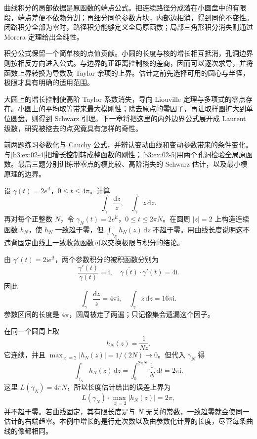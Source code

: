 \begin{chaptersummary}
曲线积分的局部依据是原函数的端点公式。把连续路径分成落在小圆盘中的有限段，端点差便不依赖分割；再细分同伦参数方块，内部边相消，得到同伦不变性。闭路积分全部为零时，路径积分能够定义全局原函数；局部三角形积分消失则通过 Morera 定理给出全纯性。

\ProseParagraphBreak

积分公式保留一个简单核的点值贡献。小圆的长度与核的增长相互抵消，孔洞边界则按相反方向进入公式。与边界的正距离控制核的差商，因而可以逐次求导，并将函数上界转换为导数及 Taylor 余项的上界。估计之前先选择可用的圆心与半径，极限才具有明确的适用范围。

\ProseParagraphBreak

大圆上的增长控制使高阶 Taylor 系数消失，导向 Liouville 定理与多项式的零点存在。小圆上的平均取等带来最大模刚性；除去原点的零因子，再让取样圆扩大到单位圆盘，则得到 Schwarz 引理。下一章将把这里的内外边界公式展开成 Laurent 级数，研究被挖去的点究竟具有怎样的奇性。
\end{chaptersummary}

\BookExercises

前两题练习参数化与 Cauchy 公式，并辨认变动曲线和变动参数带来的条件变化。与\cref{b3:ex:02-4}把增长控制转成整函数的刚性；\cref{b3:ex:02-5}用两个孔洞检验全局原函数。最后三题分别训练带零点的模比较、高阶消失的 Schwarz 估计，以及最小模原理的边界。


\begin{exercise}\label{b3:ex:02-1}
设 \(\gamma(t)=2e^{\mathrm{i}t}\)，\(0\le t\le4\pi\)。计算
\[
  \int_\gamma\frac{\mathrm{d}z}{z},
  \quad\int_\gamma\overline z\,\mathrm{d}z.
\]
再对每个正整数 \(N\)，令 \(\gamma_N(t)=2e^{\mathrm{i}t}\)，\(0\le t\le2\pi N\)。在圆周 \(|z|=2\) 上构造连续函数 \(h_N\)，使 \(h_N\) 一致趋于零，但
\(\int_{\gamma_N}h_N(z)\,\mathrm{d}z\) 不趋于零。用曲线长度说明这不违背固定曲线上一致收敛函数可以交换极限与积分的结论。
\end{exercise}
\begin{solution}
由 \(\gamma'(t)=2\mathrm{i}e^{\mathrm{i}t}\)，两个参数积分的被积函数分别为
\[
  \frac{\gamma'(t)}{\gamma(t)}=\mathrm{i},
  \quad \overline{\gamma(t)}\cdot\gamma'(t)=4\mathrm{i}.
\]
因此
\[
  \int_\gamma\frac{\mathrm{d}z}{z}=4\pi\mathrm{i},
  \quad\int_\gamma\overline z\,\mathrm{d}z=16\pi\mathrm{i}.
\]
参数区间的长度是 \(4\pi\)，圆周被走了两遍；只记像集会遗漏这个因子。

在同一个圆周上取
\[
  h_N(z)=\frac1{Nz}.
\]
它连续，并且 \(\max_{|z|=2}|h_N(z)|=1/(2N)\to0\)。但代入 \(\gamma_N\) 得
\[
  \int_{\gamma_N}h_N(z)\,\mathrm{d}z
  =\int_0^{2\pi N}\frac{\mathrm{i}}N\,\mathrm{d}t
  =2\pi\mathrm{i}.
\]
这里 \(L(\gamma_N)=4\pi N\)，所以长度估计给出的误差上界为
\[
  L(\gamma_N)\cdot\max_{|z|=2}|h_N(z)|=2\pi,
\]
并不趋于零。若曲线固定，其有限长度是与 \(N\) 无关的常数，一致趋零就会使同一估计的右端趋零。本例中增长的是行走次数以及由参数化计算的长度，尽管每条曲线的像都相同。
\end{solution}

